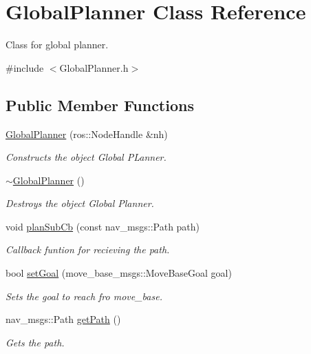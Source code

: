\hypertarget{classGlobalPlanner}{}\section{Global\+Planner Class Reference}
\label{classGlobalPlanner}


Class for global planner.  




{\ttfamily \#include $<$Global\+Planner.\+h$>$}

\subsection*{Public Member Functions}
\begin{DoxyCompactItemize}
\item 
\hyperlink{classGlobalPlanner_a93ec4b14e10e9cdf145e5b4135b19162}{Global\+Planner} (ros\+::\+Node\+Handle \&nh)
\begin{DoxyCompactList}\small\item\em Constructs the object Global P\+Lanner. \end{DoxyCompactList}\item 
\hyperlink{classGlobalPlanner_aa18249dc6b48c8fb593f517113304024}{$\sim$\+Global\+Planner} ()\hypertarget{classGlobalPlanner_aa18249dc6b48c8fb593f517113304024}{}\label{classGlobalPlanner_aa18249dc6b48c8fb593f517113304024}

\begin{DoxyCompactList}\small\item\em Destroys the object Global Planner. \end{DoxyCompactList}\item 
void \hyperlink{classGlobalPlanner_a5db720c7d92cdff38ce320ed8345285a}{plan\+Sub\+Cb} (const nav\+\_\+msgs\+::\+Path path)
\begin{DoxyCompactList}\small\item\em Callback funtion for recieving the path. \end{DoxyCompactList}\item 
bool \hyperlink{classGlobalPlanner_adf04407eda5c744d90c231155f45dee1}{set\+Goal} (move\+\_\+base\+\_\+msgs\+::\+Move\+Base\+Goal goal)
\begin{DoxyCompactList}\small\item\em Sets the goal to reach fro move\+\_\+base. \end{DoxyCompactList}\item 
nav\+\_\+msgs\+::\+Path \hyperlink{classGlobalPlanner_a3a66b51a4359b612840620ee8b328691}{get\+Path} ()
\begin{DoxyCompactList}\small\item\em Gets the path. \end{DoxyCompactList}\end{DoxyCompactItemize}


